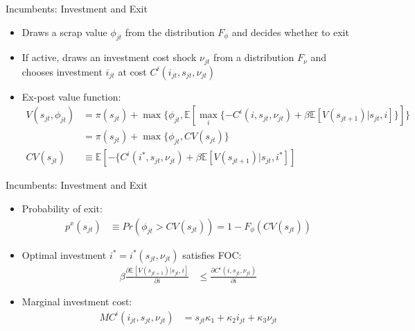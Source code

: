 \documentclass[xcolor=dvipsnames,envcountsect]{beamer}
\begin{document}
\begin{frame}{Incumbents: Investment and Exit}
\begin{itemize}
    \item Draws a scrap value $\phi_{jt}$ from the distribution $F_\phi$ and decides whether to exit
    \item If active, draws an investment cost shock $\nu_{jt}$ from a distribution $F_\nu$ and chooses investment $i_{jt}$ at cost $C^i(i_{jt},s_{jt},\nu_{jt})$
    \item Ex-post value function:
    \begin{align}
        V(s_{jt},\phi_{jt})&=\pi(s_{jt})+\max\{\phi_{jt},\mathbb{E}[\max_i\{-C^i(i,s_{jt},\nu_{jt})+\beta \mathbb{E}[V(s_{jt+1})|s_{jt},i]\}]\} \nonumber \\
           &=\pi(s_{jt})+\max\{\phi_{jt},CV(s_{jt})\}  \label{eq:incumbent_value_fn} \\
        CV(s_{jt}) & \equiv \mathbb{E}[-\{C^i(i^*,s_{jt},\nu_{jt})+\beta \mathbb{E}[V(s_{jt+1})|s_{jt},i^*]] \nonumber
    \end{align}
\end{itemize}
    
\end{frame}

\begin{frame}{Incumbents: Investment and Exit}
\begin{itemize}
\item Probability of exit:
    \begin{align}
        p^x(s_{jt}) & \equiv Pr(\phi_{jt} > CV(s_{jt})) = 1-F_\phi(CV(s_{jt})) \label{eq:exit_policy_fn}
    \end{align}

\item Optimal investment $i^*=i^*(s_{jt},\nu_{jt})$ satisfies FOC:
    \begin{align}
        \beta\frac{\partial \mathbb{E}[V(s_{jt+1})|s_{jt},i]}{\partial i} &\leq \frac{\partial C^i(i,s_{jt},\nu_{jt})}{\partial i} \label{eq:investment_policy_fn}
    \end{align}

\item Marginal investment cost:
   \begin{align}
       MC^i(i_{jt},s_{jt},\nu_{jt}) & = s_{jt} \kappa_1 + \kappa_2 i_{jt} + \kappa_3 \nu_{jt} \label{eq:investment_cost}
    \end{align} 
\end{itemize}
    
\end{frame}
\end{document}
